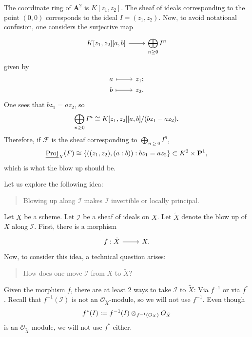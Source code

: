 \documentclass [11 pt, oneside] {article}
\begin{document}
\begin{example}\label{}\text{}
The coordinate ring of $\mathbf{A}^2$ is $K[z_1,z_2]$.
The sheaf of ideals corresponding to the point $(0,0)$ corresponds to the ideal $I = (z_1,z_2)$.
Now, to avoid notational confusion, one considers the surjective map
\[
\begin{tikzcd}
	K[z_1,z_2][a,b] \ar[r]&\displaystyle\bigoplus_{n\ge 0}I^n
\end{tikzcd}
\]
given by
\[
\begin{tikzcd}[row sep = 0 em]
	a\ar[r,mapsto]&z_1;\\
	b\ar[r,mapsto]&z_2.
\end{tikzcd}
\]
One sees that $bz_1=az_2$, so
\begin{align*}
	\bigoplus_{n\ge 0}I^n\cong K[z_1,z_2][a,b]/(bz_1-az_2).
\end{align*}
Therefore, if $\mathscr{F}$ is the sheaf corresponding to $\bigoplus_{n\ge 0}I^n$,
\begin{align*}
	\underline{\operatorname{Proj}}_X(\relax{F}) \cong \left\{ ((z_1,z_2),(a:b)): bz_1=az_2 \right\}\subset K^2\times \mathbf{P}^1, 
\end{align*}
which is what the blow up should be.
\end{example}

Let us explore the following idea:
\begin{quote}
	\small Blowing up along $\mathscr{I}$ makes $\mathscr{I}$ invertible or locally principal.
\end{quote}
Let $X$ be a scheme. Let $\mathscr{I}$ be a sheaf of ideals on $X$. Let $\tilde X$ denote the blow up of $X$ along $\mathscr{I}$. 
First, there is a morphism
\[
\begin{tikzcd}
	f:\tilde X \ar[r]& X.
\end{tikzcd}
\]
Now, to consider this idea, a technical question arises:
\begin{quote}
	\small How does one move $\mathscr{I}$ from $X$ to $\tilde X$?
\end{quote}
Given the morphism $f$, there are at least $2$ ways to take $\mathscr{I}$ to $\tilde X$: Via $f^{-1}$ or via $f^*$. Recall that $f^{-1}(\mathscr{I})$ is not an $\mathscr{O}_{\tilde X}$-module, so we will not use $f^{-1}$. Even though
\begin{align*}
	f^*(\relax{I}) := f^{-1}(\relax{I})\otimes_{f^{-1}(\relax{O}_X)} \relax{O}_{\tilde X}
\end{align*}
is an $\mathscr{O}_{\tilde X}$-module, we will not use $f^*$ either.
\end{document}
